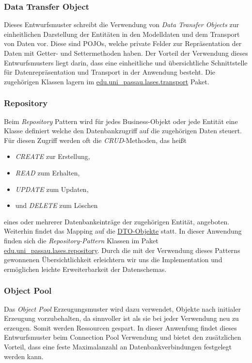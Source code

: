 \subsubsection{Data Transfer Object}
Dieses Entwurfsmuster schreibt die Verwendung von \emph{Data Transfer Objects}
zur einheitlichen Darstellung der Entitäten in den Modelldaten und dem Transport
von Daten vor.
Diese sind POJOs, welche private Felder zur Repräsentation der Daten mit Getter- und
Settermethoden haben.
Der Vorteil der Verwendung dieses Entwurfsmusters liegt darin, dass eine
einheitliche und übersichtliche Schnittstelle für Datenrepräsentation und Transport
in der Anwendung besteht. Die zugehörigen Klassen lagern im
\hyperref[arch:transport]{edu.uni\_passau.lases.transport} Paket.

\subsubsection{Repository}
Beim \emph{Repository} Pattern wird für jedes Business-Objekt oder jede Entität
eine Klasse definiert welche den Datenbankzugriff auf die zugehörigen Daten steuert.
Für diesen Zugriff werden oft die \textit{CRUD}-Methoden, das heißt
\begin{itemize}
    \item \textit{CREATE} zur Erstellung,
    \item \textit{READ} zum Erhalten,
    \item \textit{UPDATE} zum Updaten,
    \item und \textit{DELETE} zum Löschen
    \end{itemize}
eines oder mehrerer Datenbankeinträge der zugehörigen Entität, angeboten.
Weiterhin findet das Mapping auf die \hyperref[arch:transport]{DTO-Objekte} statt.
In dieser Anwendung finden sich die \emph{Repository-Pattern} Klassen im Paket
\hyperref[arch:repository]{edu.uni_passau.lases.repository}. Durch die mit
der Verwendung dieses Patterns gewonnenen Übersichtlichkeit erleichtern wir uns die
Implementation und ermöglichen leichte Erweiterbarkeit der Datenschemas.

\subsubsection{Object Pool}
Das \emph{Object Pool} Erzeugungsmuster wird dazu verwendet, Objekte nach initialer Erzeugung
vorzubehalten, da sinnvoller ist als sie bei jeder Verwendung neu zu erzeugen.
Somit werden Ressourcen gespart. In dieser Anwenfung findet dieses Entwurfsmuster
beim Connection Pool %
Verwendung und bietet den zusätzlichen Vorteil, dass eine feste Maximalanzahl an
Datenbankverbindungen festgelegt werden kann.

